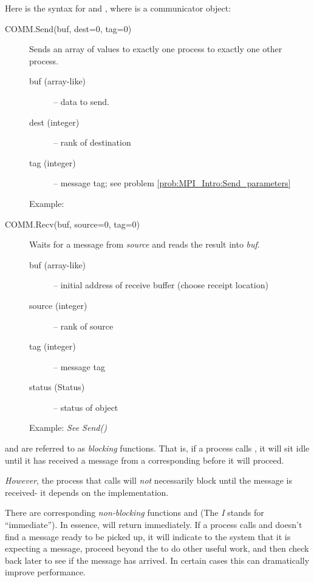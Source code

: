 Here is the syntax for  and , where  is a
communicator object:

\begin{description}
\item[COMM.Send(buf, dest=0, tag=0)]
Sends an array of values to exactly one process to exactly one other process.
\begin{description}
\item[buf (array-like)] – data to send.


\item[dest (integer)] – rank of destination
\item[tag (integer)] – message tag; see problem \ref{prob:MPI_Intro:Send_parameters}
\end{description}
Example:



\item[COMM.Recv(buf, source=0, tag=0)]
Waits for a message from \emph{source} and reads the result into \emph{buf}.
\begin{description}
\item[buf (array-like)] – initial address of receive buffer (choose receipt location)
\item[source (integer)] – rank of source
\item[tag (integer)] – message tag
\item[status (Status)] – status of object
\end{description}
Example:
\emph{See Send()}
\end{description}

\begin{info}
 and  are referred to as \emph{blocking} functions. That is,
if a process calls , it will sit idle until it has received a message
from a corresponding  before it will proceed.

\emph{However}, the process that calls  will \emph{not}
necessarily block until the message is received- it depends on the
implementation.

There are corresponding \emph{non-blocking} functions  and 
(The \emph{I} stands for ``immediate''). In essence,  will return
immediately. If a process calls  and doesn't find a message ready to
be picked up, it will indicate to the system that it is expecting a message,
proceed beyond the  to do other useful work, and then check back later
to see if the message has arrived. In certain cases this can dramatically
improve performance.
\end{info}


